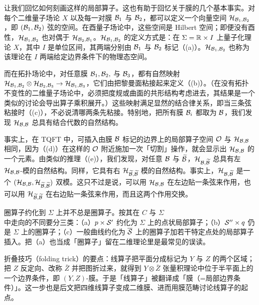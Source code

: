  让我们回忆如何刻画这样的局部算子。这也有助于回忆关于膜的几个基本事实。对每个二维量子场论 $X$ 以及每一对膜 ${\cal B}_1$ 与 ${\cal B}_2$，都可以定义一个向量空间 ${\cal H}_{{\cal
B}_1,{\cal B}_2}$，即 $({\cal B}_1,{\cal B}_2)$ 弦的空间。在酉量子场论中，这些空间是 Hilbert 空间；即便没有酉性，${\cal H}_{{\cal B}_1,{\cal B}_2}$ 也对偶于 ${\cal H}_{{\cal B}_2,{\cal B}_1}$。${\cal H}_{{\cal
B}_1,{\cal B}_2}$ 的定义方式是：在 $\Sigma=\Bbb{R}\times I$ 上量子化理论 $X$，其中 $I$ 是单位区间，其两端分别由 ${\cal B}_1$ 与 ${\cal B}_2$ 标记（\dunamp(a)）。${\cal H}_{{\cal B}_1,{\cal B}_2}$ 也称为该理论在 $I$ 两端给定边界条件下的物理态空间。

而在拓扑场论中，对任意膜 ${\cal
B}_1,{\cal B}_2,$ 与 $ {\cal B}_3$，都有自然映射 ${\cal H}_{{\cal
B}_1,{\cal B}_2}\otimes {\cal H}_{{\cal B}_2,{\cal B}_3}\to {\cal
H}_{{\cal B}_1,{\cal B}_3}$，它们由把黎曼面粘接起来定义（\dunamp(b)）。（在没有拓扑不变性的二维量子场论中，必须把度规或曲面的共形结构考虑进去，其结果是一个类似的讨论会导出算子乘积展开。）这些映射满足显然的结合律关系，即当三条弦粘接时（\dunamp(c)），不必说清哪两条先粘接。特别地，把所有膜 ${\cal B}_i$ 都取为 ${\cal B}$，我们发现 ${\cal H}_{{\cal B},{\cal B}}$ 总具有结合代数的自然结构。

事实上，在 TQFT 中，可插入由膜 ${\cal B}$ 标记的边界上的局部算子空间 ${\EUO}$ 与 ${\cal H}_{{\cal B},{\cal B}}$ 相同，因为（\dunamp(d)）在这样的 ${\EUO}$ 附近施加一次「切割」操作，就会显示出 ${\cal H}_{{\cal B},{\cal B}}$ 的一个元素。由类似的推理（\dunamp(e)），我们发现，对任意 ${\cal B}$ 与 $ \tilde{\cal
B}$，${\cal H}_{{\cal B}, \tilde{\cal B}}$ 总具有左 ${\cal H}_{{\cal B},{\cal B}}$-模的自然结构。同样，它具有右 ${\cal H}_{\tilde
{\cal B},\tilde{\cal B}}$ 模的自然结构。事实上，${\cal H}_{{\cal B},
\tilde{\cal B}}$ 是一个 $({\cal H}_{{\cal B},{\cal B}},{\cal
H}_{\tilde{\cal B},\tilde{\cal B}})$ 双模。这只不过是说，可以用 ${\cal H}_{{\cal B},{\cal B}}$ 在左边贴一条弦来作用，也可以用 ${\cal H}_{\tilde{\cal B},\tilde{\cal
B}}$ 在右边贴一条弦来作用，而且这两个作用交换。

\begin{yizhu}[易错点]
圈算子约化到 $\Sigma$ 上并不总是圈算子。按其在 $C$ 与 $\Sigma$ 中走向的不同要分三类：（a）$p\times{{\cal S}}'$ 约化为 $\Sigma$ 上的点状局部算子；（b）${{\cal S}}''\times q$ 仍是 $\Sigma$ 上的圈算子；（c）一般曲线约化为 $\bar{{\cal S}}$ 上的圈算子加若干特定点处的局部算子插入。把（a）也当成「圈算子」留在二维理论里是最常见的误读。
\end{yizhu}

\begin{yizhu}[物理图像]
折叠技巧（folding trick）的要点：线算子把平面分成标记为 $Y$ 与 $Z$ 的两个区域；把 $Z$ 反定向、改称 $\bar Z$ 并把图折过来，就得到 $Y\otimes\bar Z$ 张量积理论中位于半平面上的一个边界条件，即 $(Y,Z)$-膜。于是「线算子」被翻译成「膜（=局部边界条件）」。这一步也是后文把四维线算子变成二维膜、进而用膜范畴讨论线算子的起点。
\end{yizhu}


